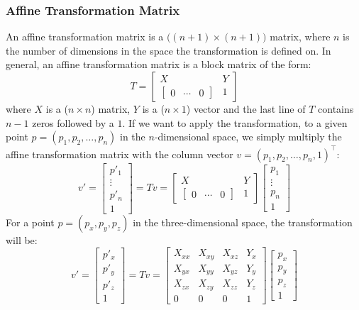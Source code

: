 \subsubsection*{Affine Transformation Matrix}
An affine transformation matrix is a $\big(\left(n+1\right)\times \left(n+1\right)\big)$ matrix, where $n$ is the number of dimensions in the space the transformation is defined on. In general, an affine transformation matrix is a block matrix of the form:
\[
T = 
\begin{bmatrix}
X & Y \\
\begin{bmatrix}
0 & \cdots & 0
\end{bmatrix} & 1
\end{bmatrix}
\]
where $X$ is a ($n\times n$) matrix, $Y$ is a ($n\times 1$) vector and the last line of $T$ contains $n-1$ zeros followed by a $1$. If we want to apply the transformation, to a given point  $p=(p_1,p_2,\ldots,p_n)$ in the $n$-dimensional space, we simply multiply the affine transformation matrix with the column vector $v=(p_1,p_2,\ldots,p_n,1)^\top$:
\[
v' = 
\begin{bmatrix}
p'_1\\
\vdots\\
p'_n\\
1
\end{bmatrix}
=
Tv = 
\begin{bmatrix}
X & Y \\
\begin{bmatrix}
0 & \cdots & 0
\end{bmatrix} & 1
\end{bmatrix}
\begin{bmatrix}
p_1\\
\vdots\\
p_n\\
1
\end{bmatrix}
\]
For a point  $p=(p_x,p_y,p_z)$ in the three-dimensional space, the transformation will be:
\[
v' = 
\begin{bmatrix}
p'_x\\
p'_y\\
p'_z\\
1
\end{bmatrix}
=
Tv = 
\begin{bmatrix}
X_{xx} & X_{xy} & X_{xz} & Y_x\\
X_{yx} & X_{yy} & X_{yz} & Y_y\\
X_{zx} & X_{zy} & X_{zz} & Y_z \\
0 & 0 & 0 & 1
\end{bmatrix} 
\begin{bmatrix}
p_x\\
p_y\\
p_z\\
1
\end{bmatrix}
\]
